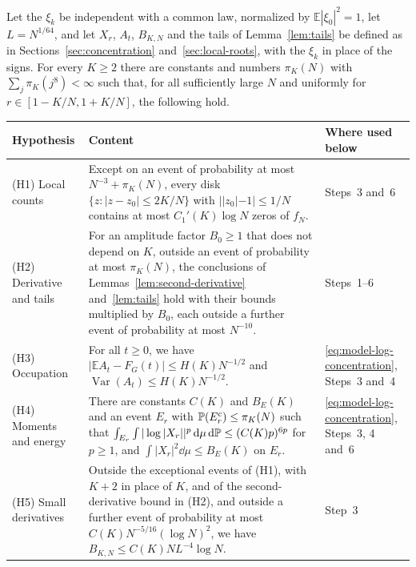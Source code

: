 \begin{namedhypothesis}[Hypotheses (H1)--(H5)]\label{hyp:models}
Let the $\xi_k$ be independent with a common law, normalized by
$\mathbb E|\xi_0|^2=1$, let $L=N^{1/64}$, and let $X_r$, $A_t$, $B_{K,N}$
and the tails of Lemma~\ref{lem:tails} be defined as in
Sections~\ref{sec:concentration} and~\ref{sec:local-roots}, with the
$\xi_k$ in place of the signs.
For every $K\ge2$ there are constants and numbers $\pi_K(N)$ with
$\sum_j\pi_K(j^8)<\infty$ such that, for all sufficiently large $N$ and
uniformly for $r\in[1-K/N,1+K/N]$, the following hold.
{\small
\renewcommand{\arraystretch}{1.15}
\begin{longtable}{@{}>{\raggedright\arraybackslash}p{}
 >{\raggedright\arraybackslash}p{}
 >{\raggedright\arraybackslash}p{}@{}}
\toprule
Hypothesis & Content & Where used below\\
\midrule
\endhead
\bottomrule
\endlastfoot
(H1) Local counts & Except on an event of probability at most
 $N^{-3}+\pi_K(N)$, every disk $\{z:|z-z_0|\le2K/N\}$ with
 $||z_0|-1|\le1/N$ contains at most $C_1'(K)\log N$ zeros of $f_N$.
 & Steps~3 and~6\\
(H2) Derivative and tails & For an amplitude factor $B_0\ge1$ that
 does not depend on $K$, outside an event of probability at most
 $\pi_K(N)$, the conclusions of Lemmas~\ref{lem:second-derivative}
 and~\ref{lem:tails} hold with their bounds multiplied by $B_0$, each
 outside a further event of probability at most $N^{-10}$.
 & Steps~1--6\\
(H3) Occupation & For all $t\ge0$, we have
 $|\mathbb EA_t-F_G(t)|\le H(K)N^{-1/2}$ and
 $\operatorname{Var}(A_t)\le H(K)N^{-1/2}$.
 & \eqref{eq:model-log-concentration}, Steps~3 and~4\\
(H4) Moments and energy & There are constants $C(K)$ and $B_E(K)$
 and an event $E_r$ with $\mathbb P(E_r^c)\le\pi_K(N)$ such that
 $\int_{E_r}\int|\log|X_r||^p\,\mathrm d\mu\,\mathrm d\mathbb P\le(C(K)p)^{6p}$ for $p\ge1$,
 and $\int|X_r|^2\dd\mu\le B_E(K)$ on $E_r$.
 & \eqref{eq:model-log-concentration}, Steps~3, 4 and~6\\
(H5) Small derivatives & Outside the exceptional events of (H1),
 with $K+2$ in place of $K$, and of the second-derivative bound in (H2),
 and outside a further event of probability at most
 $C(K)N^{-5/16}(\log N)^2$, we have $B_{K,N}\le C(K)NL^{-4}\log N$.
 & Step~3\\
\end{longtable}}
\end{namedhypothesis}

